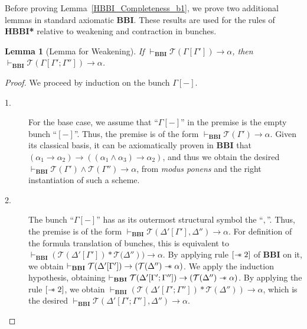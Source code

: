 \documentclass[a4paper]{article}
\newtheorem{lemma}[theorem]{Lemma}
\newcommand\magicwand{\mathrel{-\mkern-6mu*}}
\newcommand{\BBI}{\textbf{BBI}\xspace}
\begin{document}
Before proving Lemma~\ref{HBBI_Completeness_b1}, we prove two additional lemmas in standard axiomatic \BBI. These results are used for the rules of \textbf{HBBI*} relative to weakening and contraction in bunches.

\begin{lemma}[Lemma for Weakening]\label{HBBI_Weakening_lemma} If $\vdash_{\BBI}\mathcal{T}(\Gamma[\Gamma'])\rightarrow \alpha$, then $\vdash_{\BBI}\mathcal{T}(\Gamma[\Gamma'; \Gamma''])\rightarrow \alpha$.
\end{lemma}

\begin{proof}
     We proceed by induction on the bunch $\Gamma[-]$.

\begin{description}
    \item[1.] For the base case, we assume that “$\Gamma[-]$'' in the premise is the empty bunch “$[-]$''. Thus, the premise is of the form $\vdash_{\BBI}\mathcal{T}(\Gamma')\rightarrow \alpha$.
    Given its classical basis, it can be axiomatically proven in \BBI that $(\alpha_1 \rightarrow \alpha_2) \rightarrow ((\alpha_1 \land \alpha_3) \rightarrow \alpha_2)$, and thus we obtain the desired $\vdash_{\BBI}\mathcal{T}(\Gamma')\land\mathcal{T}(\Gamma'') \rightarrow \alpha$, from \textit{modus ponens} and the right instantiation of such a scheme.
    
\item[2.] The bunch “$\Gamma[-]$'' has as its outermost structural symbol the “$,$''. Thus, the premise is of the form $\vdash_{\BBI}\mathcal{T}(\Delta'[\Gamma'], \Delta'')\rightarrow \alpha$. For definition of the formula translation of bunches, this is equivalent to $\vdash_{\BBI}(\mathcal{T}(\Delta'[\Gamma']) * \mathcal{T(}\Delta''))\rightarrow \alpha$. By applying rule $[\magicwand2]$ of \BBI on it, we obtain $\vdash_{\BBI}\mathcal{T}(\Delta'[\Gamma']) \rightarrow (\mathcal{T}(\Delta'')\magicwand \alpha)$. We apply the induction hypothesis, obtaining $\vdash_{\BBI}\mathcal{T}(\Delta'[\Gamma'; \Gamma'']) \rightarrow (\mathcal{T}(\Delta'')\magicwand \alpha)$. By applying the rule $[\magicwand2]$, we obtain $\vdash_{\BBI}(\mathcal{T}(\Delta'[\Gamma'; \Gamma'']) * \mathcal{T}(\Delta''))\rightarrow \alpha$, which is the desired $\vdash_{\BBI}\mathcal{T}(\Delta'[\Gamma'; \Gamma''],\Delta'')\rightarrow \alpha$.


\end{description}
\end{proof}
\end{document}
